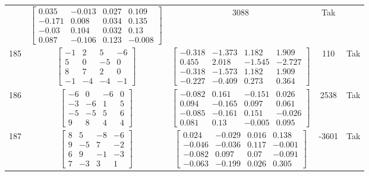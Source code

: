 \documentclass[a4paper,12pt]{article}
\begin{document}
\begin{tabular}{c c c c c}
&
$\begin{bmatrix} 0.035 & -0.013 & 0.027 & 0.109 \\ -0.171 & 0.008 & 0.034 & 0.135 \\ -0.03 & 0.104 & 0.032 & 0.13 \\ 0.087 & -0.106 & 0.123 & -0.008 \end{bmatrix}$
&
3088
&
Tak
\\
185
&
$\begin{bmatrix} -1 & 2 & 5 & -6 \\ 5 & 0 & -5 & 0 \\ 8 & 7 & 2 & 0 \\ -1 & -4 & -4 & -1 \end{bmatrix}$
&
$\begin{bmatrix} -0.318 & -1.373 & 1.182 & 1.909 \\ 0.455 & 2.018 & -1.545 & -2.727 \\ -0.318 & -1.573 & 1.182 & 1.909 \\ -0.227 & -0.409 & 0.273 & 0.364 \end{bmatrix}$
&
110
&
Tak
\\
186
&
$\begin{bmatrix} -6 & 0 & -6 & 0 \\ -3 & -6 & 1 & 5 \\ -5 & -5 & 5 & 6 \\ 9 & 8 & 4 & 4 \end{bmatrix}$
&
$\begin{bmatrix} -0.082 & 0.161 & -0.151 & 0.026 \\ 0.094 & -0.165 & 0.097 & 0.061 \\ -0.085 & -0.161 & 0.151 & -0.026 \\ 0.081 & 0.13 & -0.005 & 0.095 \end{bmatrix}$
&
2538
&
Tak
\\
187
&
$\begin{bmatrix} 8 & 5 & -8 & -6 \\ 9 & -5 & 7 & -2 \\ 6 & 9 & -1 & -3 \\ 7 & -3 & 3 & 1 \end{bmatrix}$
&
$\begin{bmatrix} 0.024 & -0.029 & 0.016 & 0.138 \\ -0.046 & -0.036 & 0.117 & -0.001 \\ -0.082 & 0.097 & 0.07 & -0.091 \\ -0.063 & -0.199 & 0.026 & 0.305 \end{bmatrix}$
&
-3601
&
Tak
\\

\end{tabular}
\end{document}
